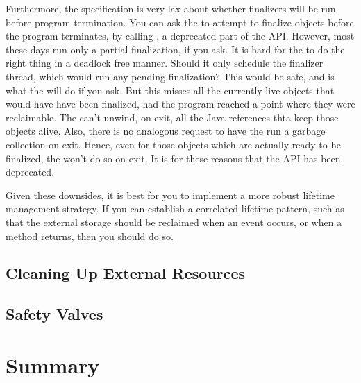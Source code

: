 Furthermore, the specification is very lax about whether finalizers will be run
before program termination. You can ask the \jre to attempt to finalize objects
before the program terminates, by calling
, a deprecated part of the API. However,
most \jres these days run only a partial finalization, if you ask. It is hard for
the \jre to do the right thing in a deadlock free manner. Should it only schedule
the finalizer thread, which would run any pending finalization? This would be
safe, and is what the \jre will do if you ask. But this misses all the
currently-live objects that would have have been finalized, had the program
reached a point where they were reclaimable. The \jre can't unwind, on exit, all
the Java references thta keep those objects alive. Also, there is no analogous
request to have the \jre run a garbage collection on exit. Hence, even for those
objects which are actually ready to be finalized, the \jre won't do so on exit.
It is for these reasons that the API has been deprecated.

Given these downsides, it is best for you to implement a more robust lifetime
management strategy. If you can establish a correlated lifetime pattern, such as
that the external storage should be reclaimed when an event occurs, or when a
method returns, then you should do so.

\subsection{Cleaning Up External Resources}
\label{sec:external-resources-details}

\subsection{Safety Valves}


\section{Summary}

\begin{table}
\centering
\begin{tabular}{cc}

\end{tabular}
\end{table}


